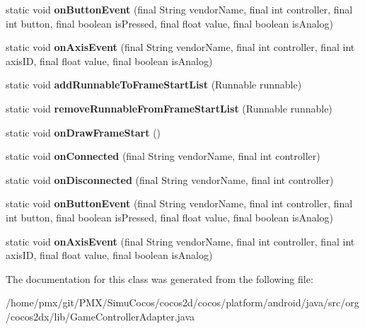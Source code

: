 \begin{DoxyCompactItemize}
static void {\bfseries on\+Button\+Event} (final String vendor\+Name, final int controller, final int button, final boolean is\+Pressed, final float value, final boolean is\+Analog)
\item 
\mbox{\label{classorg_1_1cocos2dx_1_1lib_1_1GameControllerAdapter_ae6cdf8d2b5d03c2b9dfeca3c557eb8c3}} 
static void {\bfseries on\+Axis\+Event} (final String vendor\+Name, final int controller, final int axis\+ID, final float value, final boolean is\+Analog)
\item 
\mbox{\label{classorg_1_1cocos2dx_1_1lib_1_1GameControllerAdapter_a161d2845919a0163cf356fe1bd0cd589}} 
static void {\bfseries add\+Runnable\+To\+Frame\+Start\+List} (Runnable runnable)
\item 
\mbox{\label{classorg_1_1cocos2dx_1_1lib_1_1GameControllerAdapter_af941367690ffab383e861fb48315af99}} 
static void {\bfseries remove\+Runnable\+From\+Frame\+Start\+List} (Runnable runnable)
\item 
\mbox{\label{classorg_1_1cocos2dx_1_1lib_1_1GameControllerAdapter_a0d67cb470b312edb4cf810fa95598868}} 
static void {\bfseries on\+Draw\+Frame\+Start} ()
\item 
\mbox{\label{classorg_1_1cocos2dx_1_1lib_1_1GameControllerAdapter_a81b2b82d0351f1016757ef805f04e2e0}} 
static void {\bfseries on\+Connected} (final String vendor\+Name, final int controller)
\item 
\mbox{\label{classorg_1_1cocos2dx_1_1lib_1_1GameControllerAdapter_ab8ee1c9fa51e90ef73db325940616961}} 
static void {\bfseries on\+Disconnected} (final String vendor\+Name, final int controller)
\item 
\mbox{\label{classorg_1_1cocos2dx_1_1lib_1_1GameControllerAdapter_a0ee6f49890f00c573d60fc0193b86690}} 
static void {\bfseries on\+Button\+Event} (final String vendor\+Name, final int controller, final int button, final boolean is\+Pressed, final float value, final boolean is\+Analog)
\item 
\mbox{\label{classorg_1_1cocos2dx_1_1lib_1_1GameControllerAdapter_ae6cdf8d2b5d03c2b9dfeca3c557eb8c3}} 
static void {\bfseries on\+Axis\+Event} (final String vendor\+Name, final int controller, final int axis\+ID, final float value, final boolean is\+Analog)
\end{DoxyCompactItemize}


The documentation for this class was generated from the following file\+:\begin{DoxyCompactItemize}
\item 
/home/pmx/git/\+P\+M\+X/\+Simu\+Cocos/cocos2d/cocos/platform/android/java/src/org/cocos2dx/lib/Game\+Controller\+Adapter.\+java\end{DoxyCompactItemize}
